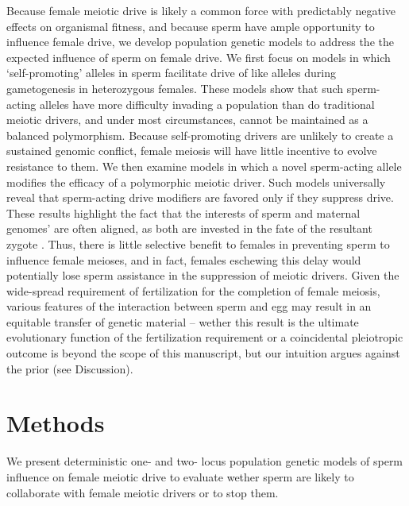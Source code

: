 \documentclass[12pt,letterpaper]{article}
\newcommand{\yb}[1]{{ \color{blue} #1}}
\begin{document}
Because female meiotic drive is likely a common force with predictably negative effects on organismal fitness,  
	and because sperm have ample opportunity to influence female drive,  
	we develop population genetic models to address the the expected influence of sperm on female drive.  
We first focus on models in which `self-promoting' alleles in
  sperm facilitate drive of like alleles during gametogenesis in heterozygous females. 
These models show that such sperm-acting alleles 
	have more difficulty invading a population than do traditional meiotic drivers, 
	 and under most circumstances, cannot be maintained as a balanced polymorphism.
Because self-promoting drivers are unlikely to create a sustained genomic conflict, 
	female meiosis will have little incentive to evolve resistance to them.
We then examine models in which a novel sperm-acting allele modifies the efficacy of a polymorphic meiotic driver. 
Such models universally reveal that sperm-acting drive modifiers are favored only if they suppress drive. 
These results highlight the fact that the interests of sperm and
maternal  genomes' are often aligned, 
as both are invested in the fate of the resultant zygote \citep[as was speculated for the \emph{In} locus, ][]{Pomiankowski1993}.
Thus, there is little selective benefit to females in preventing sperm to influence female meioses, 
	and in fact, females eschewing this delay would potentially lose sperm assistance in the suppression of meiotic drivers.  
\yb{Given the wide-spread requirement of fertilization for the completion
	of  female meiosis, various features of the interaction between sperm 
	and egg may result in an equitable transfer of genetic material -- 
	wether this result is the ultimate evolutionary function of the fertilization requirement or a coincidental pleiotropic outcome is beyond the scope of this manuscript, 
	but our intuition argues against the prior (see Discussion).}




\section*{Methods}
We present deterministic one- and two- locus population genetic models of sperm influence on female meiotic drive to evaluate wether sperm are likely to collaborate with female meiotic drivers or to stop them. \newline 
\end{document}
